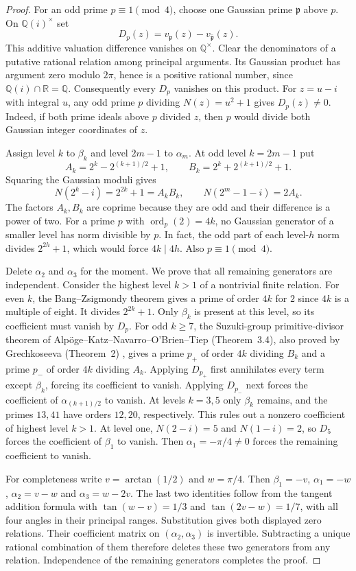 \documentclass[11pt]{article}
\begin{document}
\begin{proof}
For an odd prime $p\equiv1\pmod4$, choose one Gaussian prime
$\mathfrak p$ above $p$. On $\mathbb Q(i)^\times$ set
\[
      D_p(z)=v_{\mathfrak p}(z)-v_{\overline{\mathfrak p}}(z).
\]
This additive valuation difference vanishes on $\mathbb Q^\times$.
Clear the denominators of a putative rational relation among principal
arguments. Its Gaussian product has argument zero modulo $2\pi$, hence
is a positive rational number, since $\mathbb Q(i)\cap\mathbb R=\mathbb Q$.
Consequently every $D_p$ vanishes on this product.
For $z=u-i$ with integral $u$, any odd prime $p$ dividing $N(z)=u^2+1$
gives $D_p(z)\ne0$. Indeed, if both prime ideals above $p$ divided $z$,
then $p$ would divide both Gaussian integer coordinates of $z$.

Assign level $k$ to $\beta_k$ and level $2m-1$ to $\alpha_m$.
At odd level $k=2m-1$ put
\[
 A_k=2^k-2^{(k+1)/2}+1,\qquad B_k=2^k+2^{(k+1)/2}+1.
\]
Squaring the Gaussian moduli gives
\[
 N(2^k-i)=2^{2k}+1=A_kB_k,\qquad
 N(2^m-1-i)=2A_k .
\]
The factors $A_k,B_k$ are coprime because they are odd and their
difference is a power of two. For a prime $p$ with
$\operatorname{ord}_p(2)=4k$, no Gaussian generator of a smaller
level has norm divisible by $p$. In fact, the odd part of each
level-$h$ norm divides $2^{2h}+1$, which would force $4k\mid4h$.
Also $p\equiv1\pmod4$.

Delete $\alpha_2$ and $\alpha_3$ for the moment. We prove that all
remaining generators are independent. Consider the highest level $k>1$
of a nontrivial finite relation. For even $k$, the Bang--Zsigmondy theorem \cite[Theorem~1]{Grech} gives a prime of order $4k$ for $2$ since $4k$ is a multiple
of eight. It divides $2^{2k}+1$. Only $\beta_k$ is present at this
level, so its coefficient must vanish by $D_p$.
For odd $k\ge7$, the Suzuki-group primitive-divisor theorem
of Alp\"oge--Katz--Navarro--O'Brien--Tiep (Theorem~3.4),
also proved by Grechkoseeva (Theorem~2) \cite{AKNOT,Grech},
gives a prime $p_+$ of order $4k$ dividing $B_k$ and a prime
$p_-$ of order $4k$ dividing $A_k$. Applying $D_{p_+}$ first
annihilates every term except $\beta_k$, forcing its coefficient to
vanish. Applying $D_{p_-}$ next forces the coefficient of
$\alpha_{(k+1)/2}$ to vanish. At levels $k=3,5$ only $\beta_k$
remains, and the primes $13,41$ have orders $12,20$, respectively.
This rules out a nonzero coefficient of highest level $k>1$.
At level one, $N(2-i)=5$ and $N(1-i)=2$, so $D_5$ forces the
coefficient of $\beta_1$ to vanish. Then $\alpha_1=-\pi/4\ne0$
forces the remaining coefficient to vanish.

For completeness write $v=\arctan(1/2)$ and $w=\pi/4$. Then
$\beta_1=-v$, $\alpha_1=-w$, $\alpha_2=v-w$ and
$\alpha_3=w-2v$. The last two identities follow from the tangent
addition formula with $\tan(w-v)=1/3$ and $\tan(2v-w)=1/7$,
with all four angles in their principal ranges. Substitution gives
both displayed zero relations. Their coefficient matrix on
$(\alpha_2,\alpha_3)$ is invertible. Subtracting a unique rational
combination of them therefore deletes these two generators from any
relation. Independence of the remaining generators completes the proof.
\end{proof}
\end{document}
